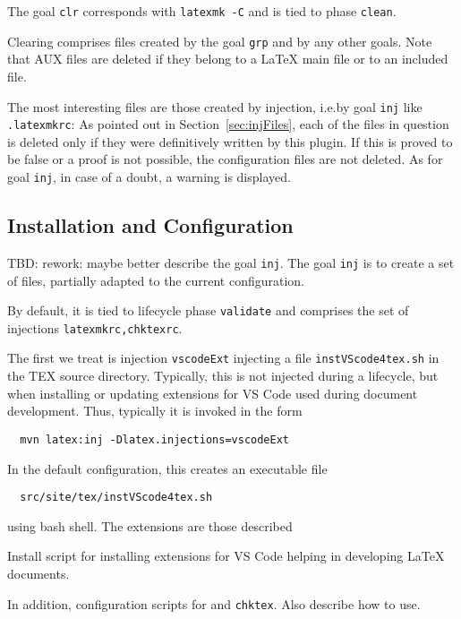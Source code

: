 The goal \texttt{clr} corresponds with \texttt{latexmk -C} and is tied to phase \texttt{clean}. 

Clearing comprises files created by the goal \texttt{grp} and by any other goals. 
Note that AUX files are deleted if they belong to a \LaTeX{} main file or to an included file. 

The most interesting files are those created by injection, 
i.e.\@ by goal \texttt{inj} like \texttt{.latexmkrc}: 
As pointed out in Section~\ref{sec:injFiles}, 
each of the files in question is deleted only 
if they were definitively written by this plugin. 
If this is proved to be false or a proof is not possible, 
the configuration files are not deleted. 
As for goal \texttt{inj}, in case of a doubt, a warning is displayed. 



\subsection{Installation and Configuration}\label{subsec:develConfig}

TBD\@: rework: maybe better describe the goal \texttt{inj}. 
The goal \texttt{inj} is to create a set of files, 
partially adapted to the current configuration. 



By default, it is tied to lifecycle phase \texttt{validate} 
and comprises the set of injections \texttt{latexmkrc,chktexrc}. 

The first we treat is injection \texttt{vscodeExt} 
injecting a file \texttt{instVScode4tex.sh} in the TEX source directory. 
Typically, this is not injected during a lifecycle, 
but when installing or updating extensions for VS Code 
used during document development. 
Thus, typically it is invoked in the form 
%
\begin{verbatim}
  mvn latex:inj -Dlatex.injections=vscodeExt
\end{verbatim}

\noindent
In the default configuration, this creates an executable file 
%
\begin{verbatim}
  src/site/tex/instVScode4tex.sh
\end{verbatim}
%
using bash shell. 
The extensions are those described 



Install script for installing extensions for VS Code 
helping in developing \LaTeX{} documents. 


In addition, configuration scripts for  and \texttt{chktex}. 
Also describe how to use. 




